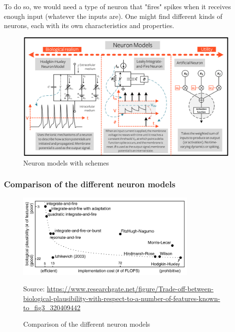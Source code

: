 \documentclass[11pt]{article}
\begin{document}
To do so, we would need a type of neuron that "fires" spikes when it receives enough input (whatever the inputs are). One might find different kinds of neurons, each with its own characteristics and properties.

\begin{figure}[H]
  \begin{center}
    \includegraphics[width=\textwidth]{./image/2_1_neuronmodels.png}
    \caption{Neuron models with schemes}
    \label{fig:neuronmodels_schemes}
  \end{center}
\end{figure}

\subsubsection{Comparison of the different neuron models}

\begin{figure}[H]
  \begin{center}
    \includegraphics[width=0.8\textwidth]{./image/comparison_neuron.png}
    \caption{Comparison of the different neuron models}
    \label{fig:comparison_neuron}
    Source: \url{https://www.researchgate.net/figure/Trade-off-between-biological-plausibility-with-respect-to-a-number-of-features-known-to_fig3_320409442}
  \end{center}
\end{figure}
\end{document}
